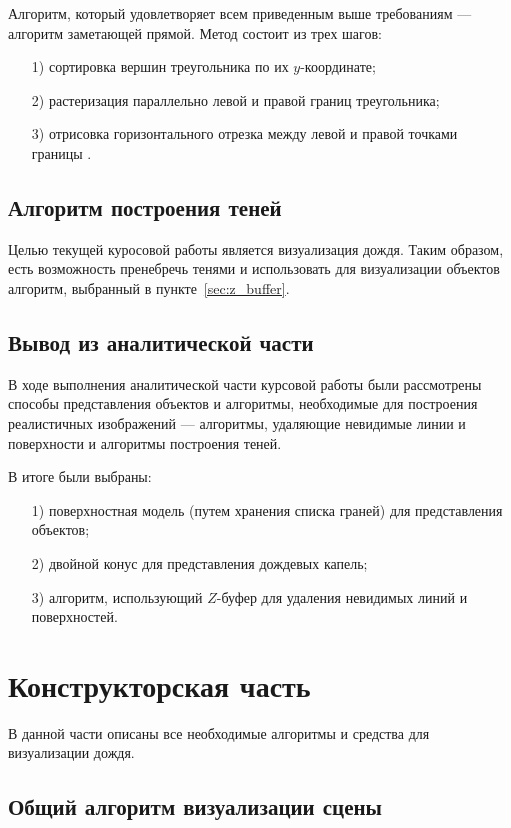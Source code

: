Алгоритм, который удовлетворяет всем приведенным выше требованиям --- алгоритм заметающей прямой. 
Метод состоит из трех шагов:
\begin{enumerate}
\item[1)] сортировка вершин треугольника по их $y$-координате;
\item[2)] растеризация параллельно левой и правой границ треугольника;
\item[3)] отрисовка горизонтального отрезка между левой и правой точками границы \cite{Souvaine2005}.
\end{enumerate}

\section{Алгоритм построения теней}

Целью текущей куросовой работы является визуализация дождя. Таким образом, есть возможность пренебречь тенями и использовать для визуализации объектов алгоритм, выбранный в пункте~\ref{sec:z_buffer}.

\section*{Вывод из аналитической части}

В ходе выполнения аналитической части курсовой работы были рассмотрены способы представления объектов и алгоритмы, необходимые для построения реалистичных изображений --- алгоритмы, удаляющие невидимые линии и поверхности и алгоритмы построения теней.

В итоге были выбраны:

\begin{enumerate}
\item[1)]
поверхностная модель (путем хранения списка граней) для представления объектов;
\item[2)]
двойной конус для представления дождевых капель;
\item[3)]
алгоритм, использующий $Z$-буфер для удаления невидимых линий и поверхностей.
\end{enumerate}

\chapter{Конструкторская часть}

В данной части описаны все необходимые алгоритмы и средства для визуализации дождя.

\section{Общий алгоритм визуализации сцены}

